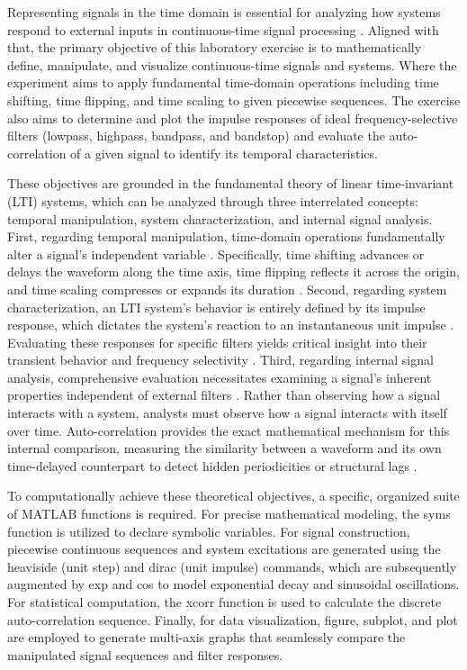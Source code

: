 Representing signals in the time domain is essential for analyzing how systems respond to external inputs in continuous-time signal processing \cite{oppenheim1997}. Aligned with that, the primary objective of this laboratory exercise is to mathematically define, manipulate, and visualize continuous-time signals and systems. Where the experiment aims to apply fundamental time-domain operations including time shifting, time flipping, and time scaling to given piecewise sequences. The exercise also aims to determine and plot the impulse responses of ideal frequency-selective filters (lowpass, highpass, bandpass, and bandstop) and evaluate the auto-correlation of a given signal to identify its temporal characteristics.

These objectives are grounded in the fundamental theory of linear time-invariant (LTI) systems, which can be analyzed through three interrelated concepts: temporal manipulation, system characterization, and internal signal analysis. First, regarding temporal manipulation, time-domain operations fundamentally alter a signal's independent variable  \cite{oppenheim1997}. Specifically, time shifting advances or delays the waveform along the time axis, time flipping reflects it across the origin, and time scaling compresses or expands its duration \cite{riskin2003}. Second, regarding system characterization, an LTI system's behavior is entirely defined by its impulse response, which dictates the system's reaction to an instantaneous unit impulse \cite{haykin1999}. Evaluating these responses for specific filters yields critical insight into their transient behavior and frequency selectivity \cite{haykin1999}. Third, regarding internal signal analysis, comprehensive evaluation necessitates examining a signal's inherent properties independent of external filters \cite{proakis2007}. Rather than observing how a signal interacts with a system, analysts must observe how a signal interacts with itself over time. Auto-correlation provides the exact mathematical mechanism for this internal comparison, measuring the similarity between a waveform and its own time-delayed counterpart to detect hidden periodicities or structural lags \cite{proakis2007}.

To computationally achieve these theoretical objectives, a specific, organized suite of MATLAB functions is required. For precise mathematical modeling, the syms function is utilized to declare symbolic variables. For signal construction, piecewise continuous sequences and system excitations are generated using the heaviside (unit step) and dirac (unit impulse) commands, which are subsequently augmented by exp and cos to model exponential decay and sinusoidal oscillations. For statistical computation, the xcorr function is used to calculate the discrete auto-correlation sequence. Finally, for data visualization, figure, subplot, and plot are employed to generate multi-axis graphs that seamlessly compare the manipulated signal sequences and filter responses.
